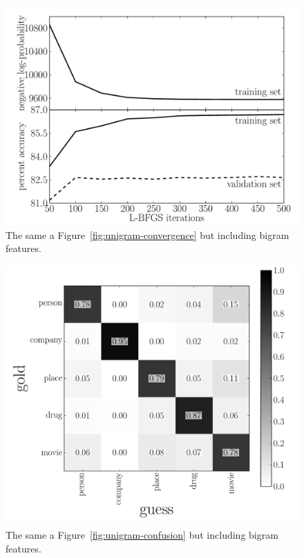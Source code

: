 \documentclass[11pt]{article}
\newcommand{\fig}[1]{Figure~\ref{fig:#1}}
\newcommand{\figlabel}[1]{\label{fig:#1}}
\begin{document}
\begin{figure}[htbp]
\begin{center}
    \includegraphics[width=\textwidth]{bigrams_convergence.pdf}
\end{center}
\caption{%
The same a \fig{unigram-convergence} but including bigram features.
\figlabel{bigram-convergence}}
\end{figure}

\begin{figure}[htbp]
\begin{center}
    \includegraphics[width=\textwidth]{bigrams_confusion.pdf}
\end{center}
\caption{%
The same a \fig{unigram-confusion} but including bigram features.
\figlabel{bigram-confusion}}
\end{figure}
\end{document}
